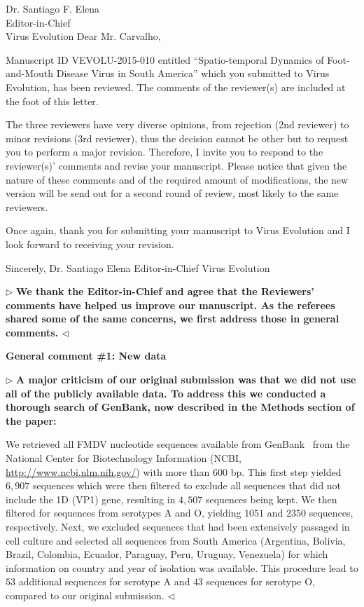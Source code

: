 \documentclass[12pt, a4paper]{letter} %
\newenvironment{reply}{$\triangleright$\bf}{$\triangleleft$}
\renewenvironment{quote}
               {\list{}{\rightmargin\leftmargin}%
                \item\relax\normalfont}
               {\endlist}
\begin{document}
\begin{letter}{
	Dr. Santiago F. Elena\\
    Editor-in-Chief \\
    Virus Evolution
}
Dear Mr. Carvalho,

Manuscript ID VEVOLU-2015-010 entitled ``Spatio-temporal Dynamics of Foot-and-Mouth Disease Virus in South America'' which you submitted to Virus Evolution, has been reviewed.  
The comments of the reviewer(s) are included at the foot of this letter.

The three reviewers have very diverse opinions, from rejection (2nd reviewer) to minor revisions (3rd reviewer), thus the decision cannot be other but to request you to perform a major revision.  
Therefore, I invite you to respond to the reviewer(s)' comments and revise your manuscript.  
Please notice that given the nature of these comments and of the required amount of modifications, the new version will be send out for a second round of review, most likely to the same reviewers.

Once again, thank you for submitting your manuscript to Virus Evolution and I look forward to receiving your revision.

Sincerely,
Dr. Santiago Elena
Editor-in-Chief
Virus Evolution

\begin{reply}
We thank the Editor-in-Chief and agree that the Reviewers' comments have helped us improve our manuscript. 
As the referees shared some of the same concerns, we first address those in general comments.
\end{reply}


\textbf{General comment \#1: New data}

\begin{reply}
A major criticism of our original submission was that we did not use all of the publicly available data.
To address this we conducted a thorough search of GenBank, now described in the Methods section of the paper:
\begin{quote}
We retrieved all FMDV nucleotide sequences available from GenBank~\citep{Benson2013} from the National Center for Biotechnology Information (NCBI, \url{ http://www.ncbi.nlm.nih.gov/}) with more than $600$ bp.
This first step yielded $6, 907$ sequences which were then filtered to exclude all sequences that did not include the 1D (VP1) gene, resulting in $4, 507$ sequences being kept.
We then filtered for sequences from serotypes A and O, yielding $1051$ and $2350$ sequences, respectively.
Next, we excluded sequences that had been extensively passaged in cell culture and selected all sequences from South America (Argentina, Bolivia, Brazil, Colombia, Ecuador, Paraguay, Peru, Uruguay, Venezuela) for which information on country and year of isolation was available.
\end{quote}
This procedure lead to $53$ additional sequences for serotype A and $43$ sequences for serotype O, compared to our original submission. 
\end{reply}



\end{letter}
\end{document}

